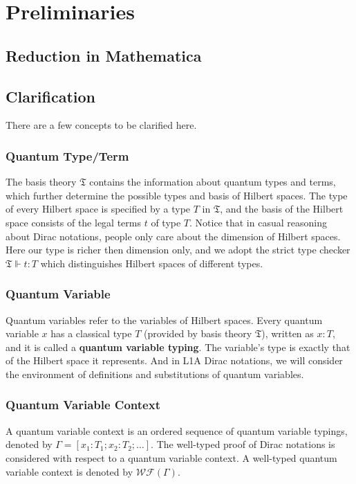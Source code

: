 \section{Preliminaries}

\subsection{Reduction in Mathematica}

\subsection{Clarification}
There are a few concepts to be clarified here.

\subsubsection*{Quantum Type/Term}
The basis theory $\mathfrak{T}$ contains the information about quantum types and terms, which further determine the possible types and basis of Hilbert spaces. The type of every Hilbert space is specified by a type $T$ in $\mathfrak{T}$, and the basis of the Hilbert space consists of the legal terms $t$ of type $T$. Notice that in casual reasoning about Dirac notations, people only care about the dimension of Hilbert spaces. Here our type is richer then dimension only, and we adopt the strict type checker $\mathfrak{T} \Vdash t : T$ which distinguishes Hilbert spaces of different types.


\subsubsection*{Quantum Variable}
Quantum variables refer to the variables of Hilbert spaces. Every quantum variable $x$ has a classical type $T$ (provided by basis theory $\mathfrak{T}$), written as $x : T$, and it is called a \textbf{quantum variable typing}. The variable's type is exactly that of the Hilbert space it represents. And in L1A Dirac notations, we will consider the environment of definitions and substitutions of quantum variables.

\subsubsection*{Quantum Variable Context}
A quantum variable context is an ordered sequence of quantum variable typings, denoted by $\Gamma = [x_1 : T_1; x_2 : T_2; \dots]$. The well-typed proof of Dirac notations is considered with respect to a quantum variable context. A well-typed quantum variable context is denoted by $\mathcal{WF}(\Gamma)$.

